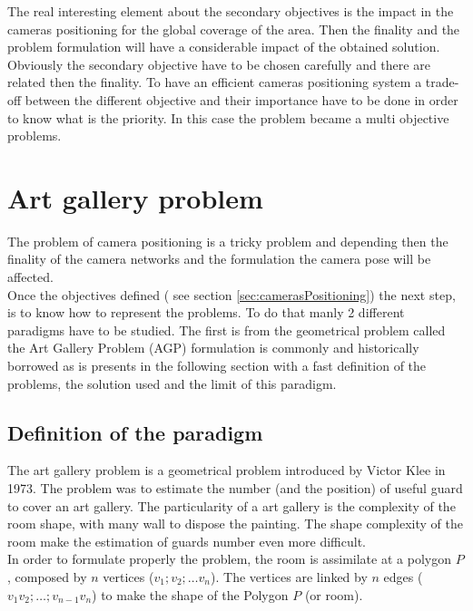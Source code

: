 The real interesting element about the secondary objectives is the impact in the cameras positioning for the global coverage of the area. Then the finality and the problem formulation will have a considerable impact of the obtained solution. Obviously the secondary objective have to be chosen carefully and there are related then the finality. To have an efficient cameras positioning system a trade-off between the different objective  and their importance have to be done in order to know what is the priority. In this case the problem became a multi objective problems. 


\section{Art gallery problem} \label{sec:AGP}

The problem of camera positioning is a tricky problem and depending then the finality of the camera networks and the formulation the camera pose will be affected.\\
 Once the objectives defined ( see section \ref{sec:camerasPositioning}) the next step, is to know how to represent the problems. To do that manly 2 different paradigms have to be studied.
 The first is from the geometrical problem called the Art Gallery Problem (AGP) formulation is commonly and historically borrowed as is presents in the following section with a fast definition of the problems, the solution used and the limit of this paradigm.


	\subsection{Definition of the paradigm}
	The art gallery problem is a geometrical problem introduced by Victor Klee in 1973. The problem was to estimate the number (and the position) of useful guard to cover an art gallery. 
The particularity of a art gallery is the complexity of the room shape, with many wall to dispose the painting. The shape complexity of the room make the estimation  of guards number even more difficult.\\
In order to formulate properly the problem, the room is assimilate at a polygon $P$, composed by $n$ vertices ($v_1; v_2;…v_n$). The vertices are linked by  $n$ edges ($v_1 v_2;…; v_{n-1} v_n$) to make  the shape of the Polygon $P$ (or room).

